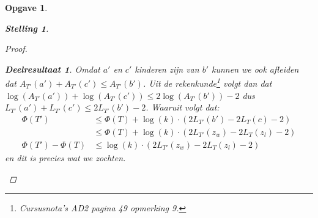 \documentclass[12pt,hidelinks]{article}
\newtheorem{opgave}{Opgave}
\newtheorem{stelling}{Stelling}
\newtheorem{deelresultaat}{Deelresultaat}
\begin{document}
\begin{opgave}
\begin{description}
\begin{stelling}
\begin{proof}
\begin{deelresultaat}
                        Omdat $a'$ en $c'$ kinderen zijn van $b'$ kunnen we ook afleiden dat $A_{T'}(a')+A_{T'}(c') \le A_{T'}(b')$. Uit de rekenkunde\footnote{Cursusnota's AD2 pagina 49 opmerking 9.} volgt dan dat $\log(A_{T'}(a'))+\log(A_{T'}(c')) \le 2\log(A_{T'}(b'))-2$ 
                        dus $L_{T'}(a')+L_{T'}(c') \le 2L_{T'}(b')-2$.
                        Waaruit volgt dat:
                        \begin{align*}
                            \Phi(T') &\le \Phi(T) +\log(k)\cdot( 2L_{T'}(b')-2L_T(c) - 2)\\
                            &\le \Phi(T) +\log(k)\cdot( 2L_{T'}(z_w)-2L_T(z_l)-2) \\
                            \Phi(T') - \Phi(T) &\le\log(k)\cdot( 2L_{T'}(z_w)-2L_T(z_l)-2)
                        \end{align*}
                        en dit is precies wat we zochten. 
                        

\end{deelresultaat}
\end{proof}
\end{stelling}
\end{description}
\end{opgave}
\end{document}
